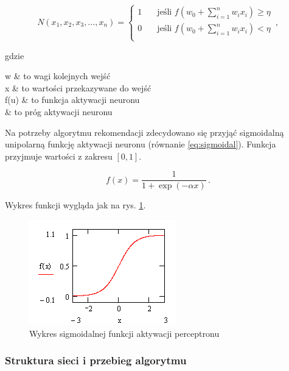 \documentclass[twoside]{iisthesis}
\begin{document}
		 \begin{equation}
		 \label{eq:neuroneq}
		 N(x_1, x_2, x_3, \ldots, x_n) = 
			 \begin{cases}
			 1       & \quad \text{jeśli } f(w_0 + \sum_{i=1}^{n}w_ix_i) \geq \eta\\
			 0		 & \quad \text{jeśli } f(w_0 + \sum_{i=1}^{n}w_ix_i) < \eta\\
			 \end{cases}
		 \,,
		 \end{equation}
		 
		 gdzie
		 
		 \begin{conditions*}
		 	w & to wagi kolejnych wejść \\
		 	x & to wartości przekazywane do wejść \\
		 	f(u) & to funkcja aktywacji neuronu \\
		 	\eta & to próg aktywacji neuronu
		 \end{conditions*} 
		 
		 Na potrzeby algorytmu rekomendacji zdecydowano się przyjąć sigmoidalną unipolarną funkcję aktywacji neuronu (równanie \ref{eq:sigmoidal}). Funkcja przyjmuje wartości z zakresu $[0,1]$.
		 
		  \begin{equation}
		  \label{eq:sigmoidal}
		  f(x) = \frac{1}{1 + \exp(-\alpha x)}
		  \,.
		  \end{equation}

		 Wykres funkcji wygląda jak na rys. \ref{fig:sigmoid}.

 		 \begin{figure}[!ht] 
			\centering
			\includegraphics{sigmoid}
			\caption{Wykres sigmoidalnej funkcji aktywacji perceptronu \protect\cite{aforgenet}}
			\label{fig:sigmoid}
		 \end{figure}

		 \subsubsection{Struktura sieci i przebieg algorytmu}
		 
\end{document}
